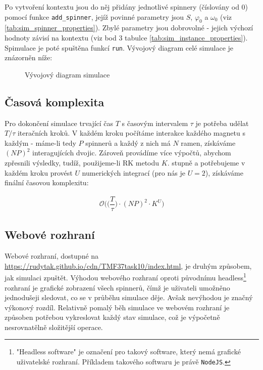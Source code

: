 Po vytvoření kontextu jsou do něj přidány jednotlivé spinnery (číslovány od 0) pomocí funkce \texttt{add\_spinner}, jejíž povinné parametry jsou $S$, $\varphi_0$ a $\omega_0$ (viz \autoref{tab:sim_spinner_properties}). Zbylé parametry jsou dobrovolné - jejich výchozí hodnoty závisí na kontextu (viz bod 3 tabulce \ref{tab:sim_instance_properties}). Spimulace je poté spuštěna funkcí \texttt{run}.
Vývojový diagram celé simulace je znázorněn níže:

\begin{figure}[!ht]
    
    \caption{Vývojový diagram simulace}
    \label{fig:flowchart}
\end{figure}

\clearpage

\subsection{Časová komplexita}

Pro dokončení simulace trvající čas $T$ s časovým intervalem $\tau$ je potřeba udělat $T/\tau$ iteračních kroků. V každém kroku počítáme interakce každého magnetu s každým - máme-li tedy $P$ spinnerů a každý z nich má $N$ ramen, získáváme $(NP)^2$ interagujících dvojic. Zároveň provádíme více výpočtů, abychom zpřesnili výsledky, tudíž, použijeme-li RK metodu $K$. stupně a potřebujeme v každém kroku provést $U$ numerických integrací (pro nás je $U = 2$), získáváme finální časovou komplexitu:

\begin{equation}
    \label{eq:sim_complexity}
    \begin{gathered}
        \mathcal{O} \bigg( \bigg( \dfrac{T}{\tau} \bigg) \cdot (N P)^2 \cdot K^U \bigg)
    \end{gathered}
\end{equation}

\subsection{Webové rozhraní}

Webové rozhraní, dostupné na \url{https://rudytak.github.io/cdn/TMF37task10/index.html}, je druhým způsobem, jak simulaci zpuštět. Výhodou webového rozhraní oproti původnímu headless\footnote{"Headless software" je označení pro takový software, který nemá grafické uživatelské rozhraní. Příkladem takového softwaru je právě \texttt{NodeJS}.} rozhraní je grafické zobrazení všech spinnerů, čímž je uživateli umožněno jednodušeji sledovat, co se v průběhu simulace děje. Avšak nevýhodou je značný výkonový rozdíl. Relativně pomalý běh simulace ve webovém rozhraní je způsoben potřebou vykreslovat každý stav simulace, což je výpočetně nesrovnatělně složitější operace. 


